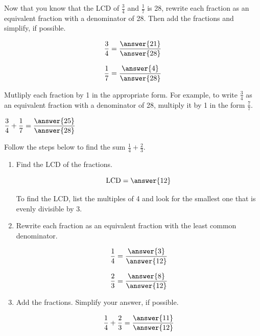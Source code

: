 \documentclass{ximera}
\begin{document}
\begin{problem}
Now that you know that the LCD of $\frac{3}{4}$ and $\textstyle \frac{1}{7}$ is 28, rewrite each fraction as an equivalent 
fraction with a denominator of 28. Then add the fractions and simplify, if possible.

\[ \frac{3}{4} = \frac{\answer{21}}{\answer{28}} \]

\[ \frac{1}{7} = \frac{\answer{4}}{\answer{28}} \]


\begin{hint}
Mutliply each fraction by 1 in the appropriate form.  For example, to write $\frac{3}{4}$ as an equivalent fraction with a denominator
of 28, multiply it by 1 in the form $\frac{7}{7}.$
\end{hint}


$\displaystyle \frac{3}{4} + \frac{1}{7} = \frac{\answer{25}}{\answer{28}} $ 
\end{problem}



\begin{problem}
Follow the steps below to find the sum $\frac{1}{4} + \frac{2}{3}.$

\begin{enumerate}
\item Find the LCD of the fractions.

\[ \textrm{LCD} = \answer{12} \] 

    \begin{hint}
      To find the LCD, list the multiples of 4 and look for the smallest one that is evenly divisible by 3. 
    \end{hint}

\item Rewrite each fraction as an equivalent fraction with the least common denominator.

\[ \frac{1}{4} = \frac{\answer{3}}{\answer{12}} \]

\[ \frac{2}{3} = \frac{\answer{8}}{\answer{12}} \]


\item Add the fractions.  Simplify your answer, if possible. 

\[ \frac{1}{4} + \frac{2}{3} = \frac{\answer{11}}{\answer{12}} \] 

\end{enumerate}
\end{problem}
\end{document}
